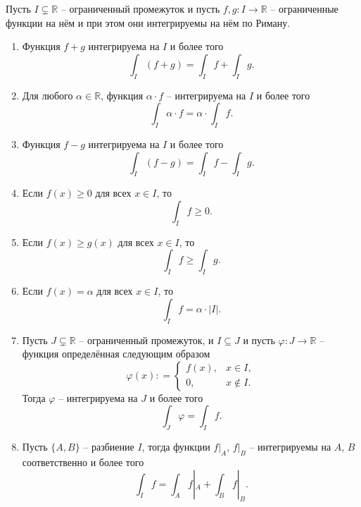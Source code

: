 \begin{theorem}\label{mega_theorem_for_int}
    Пусть $I \subsetneq \mathbb{R}$ -- ограниченный промежуток и пусть $f,g: I \to \mathbb{R}$ -- ограниченные функции на нём и при этом они интегрируемы на нём по Риману.

    \begin{enumerate}
        \item Функция $f+g$ интегрируема на $I$ и более того
        \[
         \int_I (f+g) = \int_I f + \int_I g.
        \]
        \item Для любого $\alpha \in \mathbb{R}$, функция $\alpha\cdot f$ -- интегрируема на $I$ и более того
        \[
         \int_I \alpha\cdot f = \alpha \cdot \int_I f.
        \]
        \item Функция $f-g$ интегрируема на $I$ и более того
        \[
         \int_I(f-g)  = \int_I f - \int_I g.
        \]
        \item Если $f(x) \ge 0$ для всех $x\in I$, то
        \[
         \int_I f \ge 0.
        \]
        \item Если $f(x) \ge g(x)$ для всех $x \in I$, то
        \[
         \int_I f \ge \int_I g.
        \]
        \item Если $f(x) = \alpha$ для всех $x \in I$, то
        \[
         \int_I f = \alpha\cdot |I|.
        \]
        \item Пусть $J \subsetneq \mathbb{R}$ -- ограниченный промежуток, и $I \subseteq J$ и пусть $\varphi:J \to \mathbb{R}$ -- функция определённая следующим образом
        \[
         \varphi(x): = \begin{cases}
             f(x), & x\in I,\\
             0, & x \notin I.
         \end{cases}
        \]
        Тогда $\varphi$ -- интегрируема на $J$ и более того
        \[
         \int_J \varphi = \int_I f.
        \]
        \item Пусть $\{A,B\}$ -- разбиение $I$, тогда функции $f|_A$, $f|_B$ -- интегрируемы на $A$, $B$ соответственно и более того
        \[
         \int_I f = \int_A f|_A + \int_B f|_B.
        \]
    \end{enumerate}
\end{theorem}
